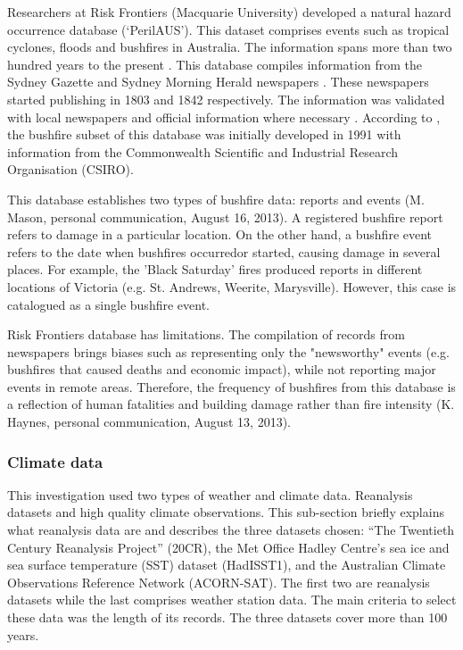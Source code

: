 Researchers at Risk Frontiers (Macquarie University) developed a natural
hazard occurrence database (\textquoteleft PerilAUS\textquoteright ).
This dataset comprises events such as tropical cyclones, floods and
bushfires in Australia. The information spans more than two hundred
years to the present \citep{Haynes2010}. This database compiles information
from the Sydney Gazette and Sydney Morning Herald newspapers \citep{Coates1996}.
These newspapers started publishing in 1803 and 1842 respectively.
The information was validated with local newspapers and official information
where necessary \citep{Crompton2010}. According to \citet{Coates1996},
the bushfire subset of this database was initially developed in 1991
with information from the Commonwealth Scientific and Industrial Research
Organisation (CSIRO). 

This database establishes two types of bushfire data: reports and
events (M. Mason, personal communication, August 16, 2013). A registered
bushfire report refers to damage in a particular location. On the
other hand, a bushfire event refers to the date when bushfires occurred\textemdash or
started\textemdash , causing damage in several places. For example,
the 'Black Saturday' fires produced reports in different locations
of Victoria (e.g. St. Andrews, Weerite, Marysville). However, this
case is catalogued as a single bushfire event. 

Risk Frontiers database has limitations. The compilation of records
from newspapers brings biases such as representing only the "newsworthy" events 
(e.g. bushfires that caused deaths and economic impact), while not reporting major events in remote areas. 
Therefore, the frequency of bushfires from this database is a reflection of human fatalities and building
damage rather than fire intensity (K. Haynes, personal communication,
August 13, 2013).


\subsubsection{Climate data \label{sub:Climate-data}}

This investigation used two types of weather and climate data. Reanalysis datasets
and high quality climate observations. This sub-section briefly explains
what reanalysis data are and describes the three datasets chosen:
``The Twentieth Century Reanalysis Project'' (20CR), the Met Office
Hadley Centre\textquoteright s sea ice and sea surface temperature
(SST) dataset (HadISST1), and the Australian Climate Observations
Reference Network (ACORN-SAT). The first two are reanalysis datasets
while the last comprises weather station data. The main criteria to
select these data was the length of its records. The three datasets
cover more than 100 years.

